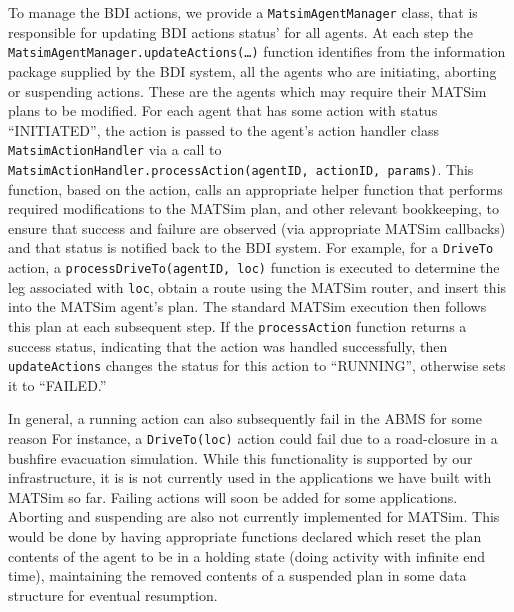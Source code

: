 To manage the BDI actions, we provide a \texttt{MatsimAgentManager} class, that
is responsible for updating BDI actions status' for all agents.
At each step the \texttt{MatsimAgentManager.updateActions(\ldots)} function
  identifies from the information package supplied by the BDI system,
  all the agents who are initiating, aborting or suspending
  actions. These are the agents which may require their MATSim plans
  to be modified.  For each agent that has some action with  
  status ``INITIATED'', the action is passed to the agent's action handler 
  class \texttt{MatsimActionHandler} via a call to
  \texttt{MatsimActionHandler.processAction(agentID, actionID, params)}.
  This function, based on the action, calls an appropriate helper
  function that performs required modifications to the MATSim plan, and other
  relevant bookkeeping, to ensure that success and failure are observed
  (via appropriate MATSim callbacks) and that status is notified back
  to the BDI system.  
%
For example, for a \texttt{DriveTo} action, a
\texttt{processDriveTo(agentID, loc)} function is executed to determine the leg 
associated with \texttt{loc}, obtain a route using the MATSim router, and
insert this into the MATSim agent's plan. The standard MATSim execution then
follows this plan at each subsequent step. 
If the \texttt{processAction} function returns a success
  status, indicating that the action was handled successfully, then
  \texttt{updateActions} changes the status for this
  action to ``RUNNING'', otherwise sets it to ``FAILED.''   
  
  In general, a running
  action can also subsequently fail in the ABMS for some reason For
  instance, a \texttt{DriveTo(loc)} action could fail due to a
  road-closure in a bushfire evacuation simulation.
  While this
  functionality is supported by our infrastructure, it is is not currently used
  in the applications we have built with MATSim so far. Failing actions will
  soon be added for some applications.
  Aborting and suspending are also not currently
  implemented for MATSim.  This would be done by having appropriate
  functions declared which reset the plan contents of the agent to be
  in a holding state (doing activity with infinite end time),
  maintaining the removed contents of a suspended plan in some data
  structure for eventual resumption.
  
